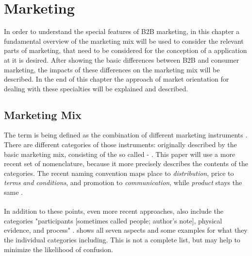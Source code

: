 \section{Marketing}
In order to understand the special features of B2B marketing, in this chapter a fundamental overview of the marketing mix will be used to consider the relevant parts of marketing, that need to be considered for the conception of a application at it is desired. After showing the basic differences between B2B and consumer marketing, the impacts of these differences on the marketing mix will be described. In the end of this chapter the approach of market orientation for dealing with these specialties will be explained and described.

\subsection{Marketing Mix}
The term  is being defined as the combination of different marketing instruments \parencite[cf.][285]{Thommen.2012}. There are  different categories of those instruments: originally described by \textcite[cf.][]{McCarthy.1993} the basic marketing mix, consisting of the so called  -  . This paper will use a more recent set of nomenclature, because it more precisely describes the contents of the categories. The recent naming convention maps place to \textit{distribution}, price to \textit{terms and conditions}, and promotion to \textit{communication}, while \textit{product} stays the same \parencites[285]{Thommen.2012}[cf.][397-720]{Meffert.2015}. 

\paragraph*{} In addition to these points, even more recent approaches, also include the categories "participants [sometimes called people; author's note], physical evidence, and process" \parencite[5]{Rafiq.1995}.  shows all seven aspects and some examples for what they the individual categories including. This is not a complete list, but may help to minimize the likelihood of confusion. 

